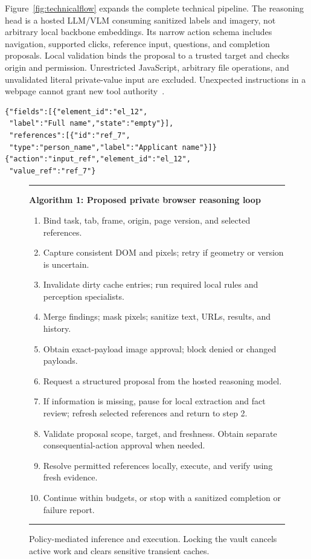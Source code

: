 \documentclass[conference]{IEEEtran}
\begin{document}
Figure~\ref{fig:technicalflow} expands the complete technical pipeline. The reasoning head is a hosted LLM/VLM consuming sanitized labels and imagery, not arbitrary local backbone embeddings. Its narrow action schema includes navigation, supported clicks, reference input, questions, and completion proposals. Local validation binds the proposal to a trusted target and checks origin and permission. Unrestricted JavaScript, arbitrary file operations, and unvalidated literal private-value input are excluded. Unexpected instructions in a webpage cannot grant new tool authority~\cite{injection}.

\begin{lstlisting}[caption={Illustrative sanitized observation and action proposal. Values are resolved locally, outside model context.},label={lst:ref}]
{"fields":[{"element_id":"el_12",
 "label":"Full name","state":"empty"}],
 "references":[{"id":"ref_7",
 "type":"person_name","label":"Applicant name"}]}
{"action":"input_ref","element_id":"el_12",
 "value_ref":"ref_7"}
\end{lstlisting}

\begin{figure}[t]
\small
\hrule\vspace{4pt}
\textbf{Algorithm 1: Proposed private browser reasoning loop}
\begin{enumerate}
\item Bind task, tab, frame, origin, page version, and selected references.
\item Capture consistent DOM and pixels; retry if geometry or version is uncertain.
\item Invalidate dirty cache entries; run required local rules and perception specialists.
\item Merge findings; mask pixels; sanitize text, URLs, results, and history.
\item Obtain exact-payload image approval; block denied or changed payloads.
\item Request a structured proposal from the hosted reasoning model.
\item If information is missing, pause for local extraction and fact review; refresh selected references and return to step 2.
\item Validate proposal scope, target, and freshness. Obtain separate consequential-action approval when needed.
\item Resolve permitted references locally, execute, and verify using fresh evidence.
\item Continue within budgets, or stop with a sanitized completion or failure report.
\end{enumerate}
\hrule
\caption{Policy-mediated inference and execution. Locking the vault cancels active work and clears sensitive transient caches.}
\label{fig:algorithm}
\end{figure}
\end{document}
